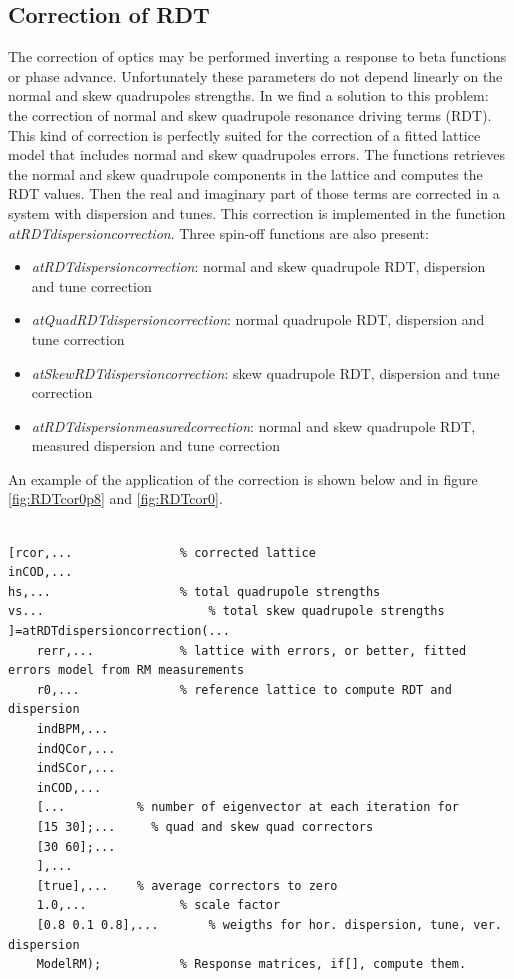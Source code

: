 \subsection{Correction of RDT}
The correction of optics may be performed inverting a response to beta functions or phase advance. Unfortunately these parameters do not depend linearly on the normal and skew quadrupoles strengths. In \cite{RDTAndrea} we find a solution to this problem: the correction of normal and skew quadrupole resonance driving terms (RDT). This kind of correction is perfectly suited for the correction of a fitted lattice model that includes normal and skew quadrupoles errors. The functions retrieves the normal and skew quadrupole components in the lattice and computes the RDT values. Then the real and imaginary part of those terms are corrected in a system with dispersion and tunes. This correction is implemented in the function \emph{atRDTdispersioncorrection}. Three spin-off functions are also present:
\begin{itemize}
\item \emph{atRDTdispersioncorrection}: normal and skew quadrupole RDT, dispersion and tune correction
\item \emph{atQuadRDTdispersioncorrection}: normal quadrupole RDT, dispersion and tune correction
\item \emph{atSkewRDTdispersioncorrection}: skew quadrupole RDT, dispersion and tune correction
\item \emph{atRDTdispersionmeasuredcorrection}: normal and skew quadrupole RDT, measured dispersion and tune correction
\end{itemize}
An example of the application of the correction is shown below and in figure \ref{fig:RDTcor0p8} and \ref{fig:RDTcor0}.

\begin{lstlisting}

[rcor,...				% corrected lattice
inCOD,...
hs,...					% total quadrupole strengths
vs...						% total skew quadrupole strengths
]=atRDTdispersioncorrection(...
    rerr,...			% lattice with errors, or better, fitted errors model from RM measurements
    r0,...				% reference lattice to compute RDT and dispersion
    indBPM,...
    indQCor,...
    indSCor,...
    inCOD,...
    [...          % number of eigenvector at each iteration for 
    [15 30];...		% quad and skew quad correctors
    [30 60];...
    ],...
    [true],...    % average correctors to zero
    1.0,... 			% scale factor
    [0.8 0.1 0.8],...		% weigths for hor. dispersion, tune, ver. dispersion
    ModelRM);			% Response matrices, if[], compute them.
		
\end{lstlisting}

